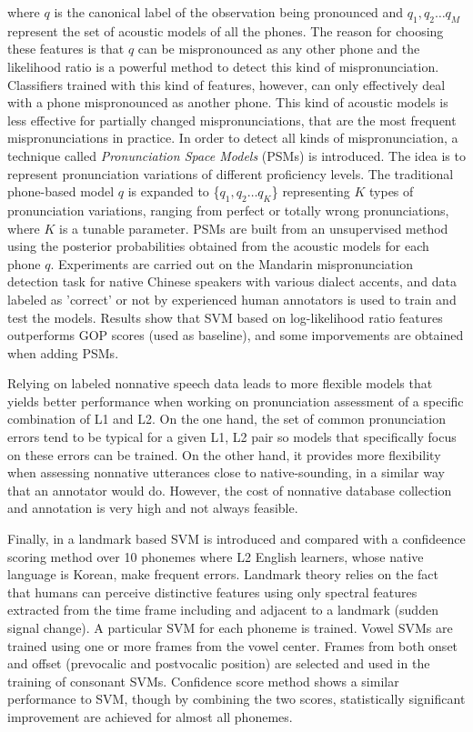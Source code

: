 where $q$ is the canonical label of the observation being pronounced and {$q_{1}, q_{2} \dotsc q_{M}$}
represent the set of acoustic models of all the phones. The reason for choosing these features is
that $q$ can be mispronounced as any other phone and the likelihood ratio is a powerful
method to detect this kind of mispronunciation. Classifiers trained with this kind of features, however, 
can only effectively deal with a phone mispronounced as another phone. This kind of acoustic models is 
less effective for partially changed mispronunciations, that are the most frequent mispronunciations
in practice. In order to detect all kinds of mispronunciation, a technique called  
\textit{Pronunciation Space Models} (PSMs) is introduced. The idea is to represent pronunciation variations
of different proficiency levels. The traditional phone-based model $q$ is expanded to 
\{$q_{1}, q_{2} \dotsc q_{K}$\} representing $K$ types of pronunciation variations, ranging from perfect or
totally wrong pronunciations, where $K$ is a tunable parameter. PSMs are built from an unsupervised method
using the posterior probabilities obtained from the acoustic models for each phone $q$.
Experiments are carried out on the 
Mandarin mispronunciation detection task for native Chinese speakers with various dialect accents, 
and data labeled as 'correct' or not by experienced human annotators is used to train and test the models.
Results show that SVM based on log-likelihood ratio features outperforms GOP scores (used as baseline), and some
imporvements are obtained when adding PSMs.

Relying on labeled nonnative speech data leads to more flexible models that yields better performance
when working on pronunciation assessment of a specific combination of L1 and L2. On the one hand,
the set of common pronunciation errors tend to be typical for a given L1, L2 pair so 
models that specifically focus on these errors can be trained. On the other hand, it provides more 
flexibility when assessing nonnative utterances close to native-sounding, in a similar way that
an annotator would do. However, the cost of nonnative database collection and annotation is very
high and not always feasible.

Finally, in \cite{landmark_svm}\cite{landmark_svm_2} a landmark based 
SVM is introduced and compared with a confideence scoring method over 10 phonemes where 
L2 English learners, whose native language is Korean, make frequent errors. 
Landmark theory relies on the fact that humans can perceive distinctive
features using only spectral features extracted from the time frame including and adjacent to
a landmark (sudden signal change). A particular SVM for each phoneme is trained. Vowel SVMs are 
trained using one or more frames from the vowel center. Frames from both onset and offset
(prevocalic and postvocalic position) are selected and used in the training of consonant
SVMs. Confidence score method shows a similar performance to SVM, though by combining 
the two scores, statistically significant improvement are achieved for almost all phonemes.

